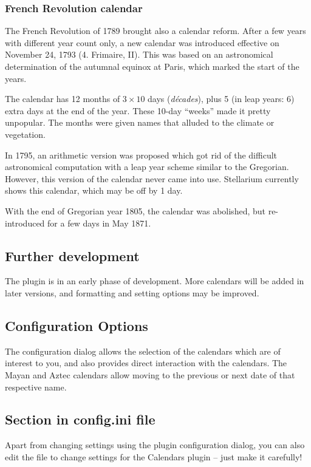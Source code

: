 \subsubsection{French Revolution calendar}
The French Revolution of 1789 brought also a calendar reform. After a
few years with different year count only, a new calendar was
introduced effective on November 24, 1793 (4. Frimaire, II). This was
based on an astronomical determination of the autumnal equinox at
Paris, which marked the start of the years.

The calendar has 12 months of $3\times 10$ days (\emph{d\'ecades}), plus
5 (in leap years: 6) extra days at the end of the year. These 10-day
``weeks'' made it pretty unpopular. The months were given names that
alluded to the climate or vegetation.

In 1795,  an arithmetic version was proposed which
got rid of the difficult astronomical computation with a leap year
scheme similar to the Gregorian. However, this version of the calendar
never came into use.  Stellarium currently shows this calendar, which
may be off by 1 day.

With the end of Gregorian year 1805, the calendar was abolished, but
re-introduced for a few days in May 1871.

\subsection{Further development}
The plugin is in an early phase of development. More calendars will be
added in later versions, and formatting and setting options may be
improved.


\subsection{Configuration Options}
\label{sec:plugin:Calendars:configuration}

The configuration dialog allows the selection of the calendars which are
of interest to you, and also provides direct interaction with the calendars.
The Mayan and Aztec calendars allow moving to the previous or next date of that respective name. 

\subsection*{Section  in config.ini file}

Apart from changing settings using the plugin configuration dialog,
you can also edit the  file to change
settings for the Calendars plugin -- just make it carefully!

